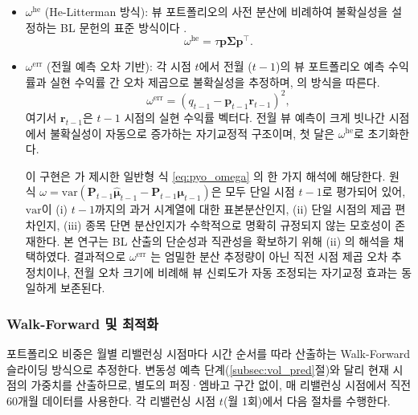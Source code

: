 \documentclass[eng]{kjas3}
\begin{document}
\begin{itemize}
  \item $\omega^{\mathrm{he}}$ (He-Litterman 방식): 뷰 포트폴리오의 사전 분산에 비례하여 불확실성을 설정하는 BL 문헌의 표준 방식이다 \citep{helitterman1999}.
    \begin{equation}
      \omega^{\mathrm{he}} = \tau\mathbf{p}\boldsymbol{\Sigma}\mathbf{p}^\top.
    \end{equation}

  \item $\omega^{\mathrm{err}}$ (전월 예측 오차 기반): 각 시점 $t$에서 전월 ($t-1$)의 뷰 포트폴리오 예측 수익률과 실현 수익률 간 오차 제곱으로 불확실성을 추정하며, \citet{pyo2018}의 방식을 따른다.
    \begin{equation}
      \omega^{\mathrm{err}} = \left(q_{t-1} - \mathbf{p}_{t-1}\mathbf{r}_{t-1}\right)^2,
    \end{equation}
    여기서 $\mathbf{r}_{t-1}$은 $t-1$ 시점의 실현 수익률 벡터다. 전월 뷰 예측이 크게 빗나간 시점에서 불확실성이 자동으로 증가하는 자기교정적 구조이며, 첫 달은 $\omega^{\mathrm{he}}$로 초기화한다.

    이 구현은 \citet{pyo2018} 가 제시한 일반형 식 \eqref{eq:pyo_omega} 의 한 가지 해석에 해당한다. 원 식 $\omega = \mathrm{var}(\mathbf{P}_{t-1}\hat{\boldsymbol{\mu}}_{t-1} - \mathbf{P}_{t-1}\boldsymbol{\mu}_{t-1})$은 모두 단일 시점 $t-1$로 평가되어 있어, $\mathrm{var}$이 (i) $t-1$까지의 과거 시계열에 대한 표본분산인지, (ii) 단일 시점의 제곱 편차인지, (iii) 종목 단면 분산인지가 수학적으로 명확히 규정되지 않는 모호성이 존재한다. 본 연구는 BL 산출의 단순성과 직관성을 확보하기 위해 (ii) 의 해석을 채택하였다. 결과적으로 $\omega^{\mathrm{err}}$ 는 엄밀한 분산 추정량이 아닌 직전 시점 제곱 오차 추정치이나, 전월 오차 크기에 비례해 뷰 신뢰도가 자동 조정되는 자기교정 효과는 동일하게 보존된다.
\end{itemize}

\subsubsection{Walk-Forward 및 최적화}
\label{subsubsec:bl_walkforward}

포트폴리오 비중은 월별 리밸런싱 시점마다 시간 순서를 따라 산출하는 Walk-Forward 슬라이딩 방식으로 추정한다. 변동성 예측 단계(\ref{subsec:vol_pred}절)와 달리 현재 시점의 가중치를 산출하므로, 별도의 퍼징·엠바고 구간 없이, 매 리밸런싱 시점에서 직전 60개월 데이터를 사용한다. 각 리밸런싱 시점 $t$(월 1회)에서 다음 절차를 수행한다.
\end{document}
